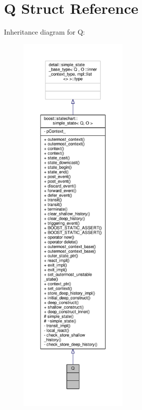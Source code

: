 \hypertarget{struct_q}{}\section{Q Struct Reference}
\label{struct_q}


Inheritance diagram for Q\+:
\nopagebreak
\begin{figure}[H]
\begin{center}
\leavevmode
\includegraphics[height=550pt]{struct_q__inherit__graph}
\end{center}
\end{figure}


